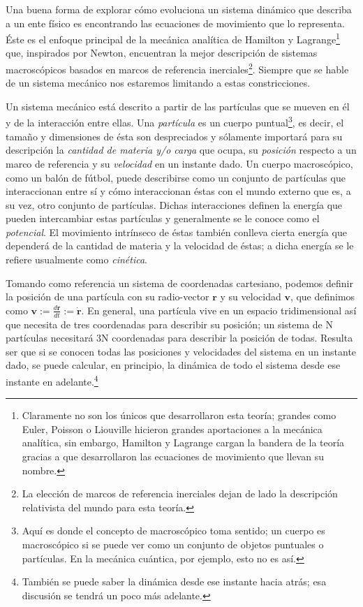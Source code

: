 Una buena forma de explorar cómo evoluciona un sistema dinámico que describa a un ente físico es encontrando las ecuaciones de movimiento que lo representa. Éste es el enfoque principal de la mecánica analítica de Hamilton y Lagrange\footnote{Claramente no son los únicos que desarrollaron esta teoría; grandes como Euler, Poisson o Liouville hicieron grandes aportaciones a la mecánica analítica, sin embargo, Hamilton y Lagrange cargan la bandera de la teoría gracias a que desarrollaron las ecuaciones de movimiento que llevan su nombre.} que, inspirados por Newton, encuentran la mejor descripción de sistemas macroscópicos basados en marcos de referencia inerciales\footnote{La elección de marcos de referencia inerciales dejan de lado la descripción relativista del mundo para esta teoría.}. Siempre que se hable de un sistema mecánico nos estaremos limitando a estas constricciones. 

Un sistema mecánico está descrito a partir de las partículas que se mueven en él y de la interacción entre ellas. Una \textit{partícula} es un cuerpo puntual\footnote{Aquí es donde el concepto de macroscópico toma sentido; un cuerpo es macroscópico si se puede ver como un conjunto de objetos puntuales o partículas. En la mecánica cuántica, por ejemplo, esto no es así.}, es decir, el tamaño y dimensiones de ésta son despreciados y sólamente importará para su descripción la \textit{cantidad de materia y/o carga} que ocupa, su \textit{posición} respecto a un marco de referencia y su \textit{velocidad} en un instante dado. Un cuerpo macroscópico, como un balón de fútbol, puede describirse como un conjunto de partículas que interaccionan entre sí y cómo interaccionan éstas con el mundo externo que es, a su vez, otro conjunto de partículas. Dichas interacciones definen la energía que pueden intercambiar estas partículas y generalmente se le conoce como el \textit{potencial}. El movimiento intrínseco de éstas también conlleva cierta energía que dependerá de la cantidad de materia y la velocidad de éstas; a dicha energía se le refiere usualmente como \textit{cinética}. 

Tomando como referencia un sistema de coordenadas cartesiano, podemos definir la posición de una partícula con su radio-vector $\mathbf{r}$ y su velocidad $\mathbf{v}$, que definimos como $\mathbf{v} := \frac{d \mathbf{r}}{dt} := \dot{\mathbf{r}}$. En general, una partícula vive en un espacio tridimensional así que necesita de tres coordenadas para describir su posición; un sistema de N partículas necesitará 3N coordenadas para describir la posición de todas. Resulta ser que si se conocen todas las posiciones y velocidades del sistema en un instante dado, se puede calcular, en principio, la dinámica de todo el sistema desde ese instante en adelante.\footnote{También se puede saber la dinámica desde ese instante hacia atrás; esa discusión se tendrá un poco más adelante.} 


